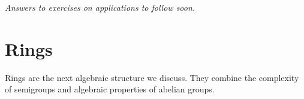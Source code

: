 \documentclass{article}
\theoremstyle{definition}
\theoremstyle{remark}
\theoremstyle{definition}
\theoremstyle{definition}
\theoremstyle{definition}
\theoremstyle{proof}
\newcommand{\order}[1]{\left\vert #1 \right\vert}
\newcommand{\nsg}[0]{\trianglelefteq}
\begin{document}
\hrulefill

\textit{Answers to exercises on applications to follow soon.}
\newpage
\section{Rings}
Rings are the next algebraic structure we discuss. They combine the complexity of semigroups and algebraic properties of abelian groups.
\end{document}
